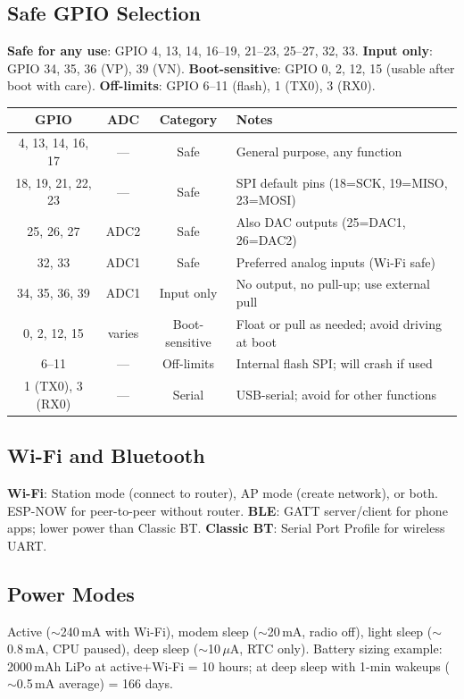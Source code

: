 \subsection{Safe GPIO Selection}
\textbf{Safe for any use}: GPIO 4, 13, 14, 16--19, 21--23, 25--27, 32, 33. \textbf{Input only}: GPIO 34, 35, 36 (VP), 39 (VN). \textbf{Boot-sensitive}: GPIO 0, 2, 12, 15 (usable after boot with care). \textbf{Off-limits}: GPIO 6--11 (flash), 1 (TX0), 3 (RX0).

\begin{quickrefbox}
\begin{table}[H]\centering\small
\begin{tabularx}{\linewidth}{c c c X}
\toprule
\textbf{GPIO} & \textbf{ADC} & \textbf{Category} & \textbf{Notes} \\
\midrule
4, 13, 14, 16, 17 & --- & Safe & General purpose, any function \\
18, 19, 21, 22, 23 & --- & Safe & SPI default pins (18=SCK, 19=MISO, 23=MOSI) \\
25, 26, 27 & ADC2 & Safe & Also DAC outputs (25=DAC1, 26=DAC2) \\
32, 33 & ADC1 & Safe & Preferred analog inputs (Wi-Fi safe) \\
34, 35, 36, 39 & ADC1 & Input only & No output, no pull-up; use external pull \\
0, 2, 12, 15 & varies & Boot-sensitive & Float or pull as needed; avoid driving at boot \\
6--11 & --- & Off-limits & Internal flash SPI; will crash if used \\
1 (TX0), 3 (RX0) & --- & Serial & USB-serial; avoid for other functions \\
\bottomrule
\end{tabularx}
\end{table}
\end{quickrefbox}

\subsection{Wi-Fi and Bluetooth}
\textbf{Wi-Fi}: Station mode (connect to router), AP mode (create network), or both. ESP-NOW for peer-to-peer without router. \textbf{BLE}: GATT server/client for phone apps; lower power than Classic BT. \textbf{Classic BT}: Serial Port Profile for wireless UART.

\subsection{Power Modes}
Active ($\sim$240\,mA with Wi-Fi), modem sleep ($\sim$20\,mA, radio off), light sleep ($\sim$0.8\,mA, CPU paused), deep sleep ($\sim$10\,$\mu$A, RTC only). Battery sizing example: 2000\,mAh LiPo at active+Wi-Fi = 10 hours; at deep sleep with 1-min wakeups ($\sim$0.5\,mA average) = 166 days.

